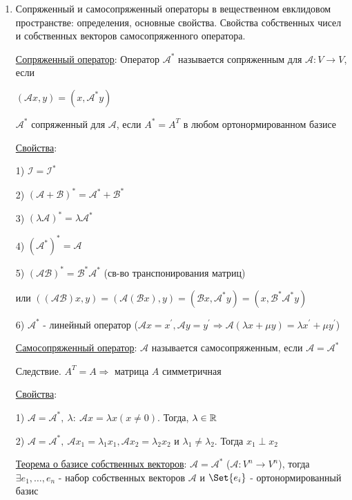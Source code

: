 \documentclass[12pt]{article}
\begin{document}
\begin{enumerate}
        \item Сопряженный и самосопряженный операторы в вещественном евклидовом пространстве: определения, основные свойства. Свойства собственных чисел и собственных векторов самосопряженного оператора.

        \hyperlink{conjugateoperator}{Сопряженный оператор}: Оператор $\mathcal{A}^*$ называется сопряженным для $\mathcal{A} : V \to V$, если

        $(\mathcal{A}x, y) = (x, \mathcal{A}^* y)$

        $\mathcal{A}^*$ сопряженный для $\mathcal{A}$, если $A^* = A^T$ в любом ортонормированном базисе

        \hyperlink{conjugateoperatorproperties}{Свойства}:

        1) $\mathcal{I} = \mathcal{I}^*$

        2) $(\mathcal{A} + \mathcal{B})^* = \mathcal{A}^* + \mathcal{B}^*$

        3) $(\lambda \mathcal{A})^* = \lambda \mathcal{A}^*$

        4) $(\mathcal{A}^*)^* = \mathcal{A}$

        5) $(\mathcal{A}\mathcal{B})^* = \mathcal{B}^* \mathcal{A}^*$ (св-во транспонирования матриц)

        или $((\mathcal{AB})x, y) = (\mathcal{A}(\mathcal{B}x), y) = (\mathcal{B}x, \mathcal{A}^* y) = (x, \mathcal{B}^* \mathcal{A}^* y)$

        6) $\mathcal{A}^*$ - линейный оператор ($\mathcal{A}x = x^\prime, \mathcal{A}y = y^\prime \Longrightarrow \mathcal{A}(\lambda x + \mu y) = \lambda x^\prime + \mu y^\prime$)

        \hyperlink{selfconjugateoperator}{Самосопряженный оператор}: $\mathcal{A}$ называется самосопряженным, если $\mathcal{A} = \mathcal{A}^*$

        Следствие. $A^T = A \Longrightarrow$ матрица $A$ симметричная

        \hyperlink{selfconjugateoperatorproperties}{Свойства}:

        1) $\mathcal{A} = \mathcal{A}^*, \ \lambda : \ \mathcal{A}x = \lambda x (x \neq 0)$. Тогда, $\lambda \in \mathbb{R}$

        2) $\mathcal{A} = \mathcal{A}^*, \ \mathcal{A}x_1 = \lambda_1 x_1, \mathcal{A}x_2 = \lambda_2 x_2$ и $\lambda_1 \neq \lambda_2$. Тогда $x_1 \perp x_2$

        \hyperlink{theoremabouteigenvectorsinselfconjugateoperator}{Теорема о базисе собственных векторов}: $\mathcal{A} = \mathcal{A}^*$ ($\mathcal{A} : V^n \to V^n$),
        тогда $\exists e_1, \dots, e_n$ - набор собственных векторов $\mathcal{A}$ и $\Set{e_i}$ - ортонормированный базис


\end{enumerate}
\end{document}
